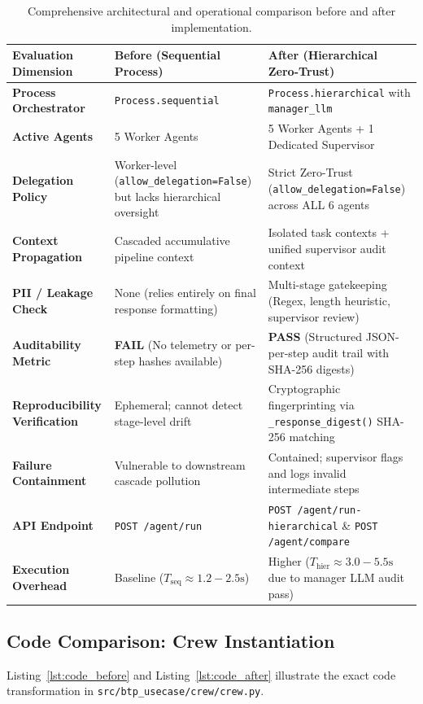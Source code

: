 \documentclass[10pt,a4paper]{article}
\begin{document}
\begin{table}[htbp]
\centering
\small
\renewcommand{\arraystretch}{1.3}
\begin{tabularx}{\textwidth}{p{3.2cm} X X}
\toprule
\textbf{Evaluation Dimension} & \textbf{Before (Sequential Process)} & \textbf{After (Hierarchical Zero-Trust)} \\
\midrule
\textbf{Process Orchestrator} & \texttt{Process.sequential} & \texttt{Process.hierarchical} with \texttt{manager\_llm} \\
\textbf{Active Agents} & 5 Worker Agents & 5 Worker Agents + 1 Dedicated Supervisor \\
\textbf{Delegation Policy} & Worker-level (\texttt{allow\_delegation=False}) but lacks hierarchical oversight & Strict Zero-Trust (\texttt{allow\_delegation=False}) across ALL 6 agents \\
\textbf{Context Propagation} & Cascaded accumulative pipeline context & Isolated task contexts + unified supervisor audit context \\
\textbf{PII / Leakage Check} & None (relies entirely on final response formatting) & Multi-stage gatekeeping (Regex, length heuristic, supervisor review) \\
\textbf{Auditability Metric} & \textbf{FAIL} (No telemetry or per-step hashes available) & \textbf{PASS} (Structured JSON-per-step audit trail with SHA-256 digests) \\
\textbf{Reproducibility Verification} & Ephemeral; cannot detect stage-level drift & Cryptographic fingerprinting via \texttt{\_response\_digest()} SHA-256 matching \\
\textbf{Failure Containment} & Vulnerable to downstream cascade pollution & Contained; supervisor flags and logs invalid intermediate steps \\
\textbf{API Endpoint} & \texttt{POST /agent/run} & \texttt{POST /agent/run-hierarchical} \& \texttt{POST /agent/compare} \\
\textbf{Execution Overhead} & Baseline ($T_{\text{seq}} \approx 1.2 - 2.5\text{s}$) & Higher ($T_{\text{hier}} \approx 3.0 - 5.5\text{s}$ due to manager LLM audit pass) \\
\bottomrule
\end{tabularx}
\caption{Comprehensive architectural and operational comparison before and after implementation.}
\label{tab:comparison_matrix}
\end{table}

\subsection{Code Comparison: Crew Instantiation}
Listing~\ref{lst:code_before} and Listing~\ref{lst:code_after} illustrate the exact code transformation in \texttt{src/btp\_usecase/crew/crew.py}.
\end{document}
